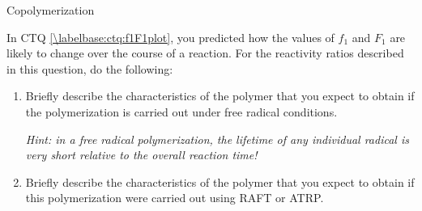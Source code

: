 \begin{activity}{Copolymerization}
\begin{exercises}
	\exercise In CTQ \ref{\labelbase:ctq:f1F1plot}, you predicted how the values of $f_1$ and $F_1$ are likely to change over the course of a reaction.  For the reactivity ratios described in this question, do the following: \label{\labelbase:exc:compshift}
	
		\begin{enumerate}
			\item Briefly describe the characteristics of the polymer that you expect to obtain if the polymerization is carried out under free radical conditions.
			
				\emph{Hint: in a free radical polymerization, the lifetime of any individual radical is very short relative to the overall reaction time!}
			
				\begin{solution}\end{solution}
				
			\item Briefly describe the characteristics of the polymer that you expect to obtain if this polymerization were carried out using RAFT or ATRP.
			
				\begin{solution}\end{solution}
				
		\end{enumerate}
	
	
\end{exercises}


%
%	


	
\end{activity}
